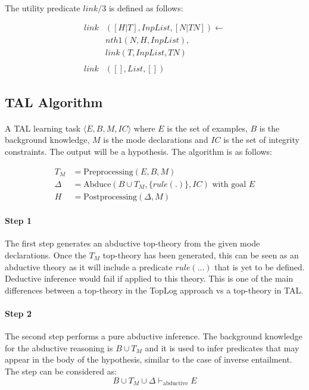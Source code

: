 \documentclass{article}
\theoremstyle{plain}
\theoremstyle{definition}
\begin{document}
\begin{multicols}{2}
\paragraph{} The utility predicate $link/3$ is defined as follows:

\begin{align*}
link&([H|T], InpList, [N|TN]) \leftarrow\\
& nth1(N, H, InpList),\\
& link(T, InpList, TN)\\
\\
link&([], List, [])
\end{align*}

\subsection{TAL Algorithm}

\paragraph{} A TAL learning task $\langle E, B, M, IC\rangle$ where $E$ is the set of examples, $B$ is the background knowledge, $M$ is the mode declarations and $IC$ is the set of integrity constraints. The output will be a hypothesis. The algorithm is as follows:

\begin{align*}
T_M &= \text{Preprocessing}(E, B, M)\\
\Delta &= \text{Abduce}(B \cup T_M, \{rule(.)\}, IC) \text{ with goal }E\\
H &= \text{Postprocessing}(\Delta, M)
\end{align*}

\paragraph{Step 1} The first step generates an abductive top-theory from the given mode declarations. Once the $T_M$ top-theory has been generated, this can be seen as an abductive theory as it will include a predicate $rule(\dots)$ that is yet to be defined. Deductive inference would fail if applied to this theory. This is one of the main differences between a top-theory in the TopLog approach vs a top-theory in TAL.

\paragraph{Step 2} The second step performs a pure abductive inference. The background knowledge for the abductive reasoning is $B \cup T_M$ and it is used to infer predicates that may appear in the body of the hypothesis, similar to the case of inverse entailment. The step can be considered as: $$B \cup T_M \cup \Delta \vdash_\text{abductive} E$$


\end{multicols}
\end{document}
